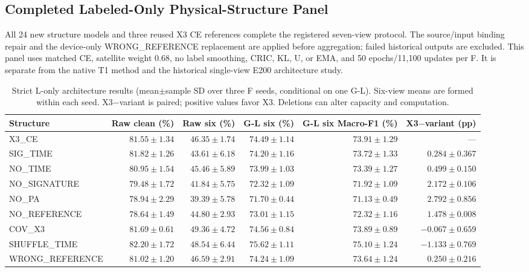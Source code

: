\subsection{Completed Labeled-Only Physical-Structure Panel}

All 24 new structure models and three reused X3 CE references complete the registered seven-view protocol. The source/input binding repair and the device-only WRONG\_REFERENCE replacement are applied before aggregation; failed historical outputs are excluded. This panel uses matched CE, satellite weight 0.68, no label smoothing, CRIC, KL, U, or EMA, and 50 epochs/11,100 updates per F. It is separate from the native T1 method and the historical single-view E200 architecture study.

\begin{table}[t]\centering\footnotesize\caption{Strict L-only architecture results (mean$\pm$sample SD over three F seeds, conditional on one G-L). Six-view means are formed within each seed. X3$-$variant is paired; positive values favor X3. Deletions can alter capacity and computation.}\label{tab:structure-complete}\begin{tabular}{lrrrrr}\toprule

Structure & Raw clean (\%) & Raw six (\%) & G-L six (\%) & G-L six Macro-F1 (\%) & X3$-$variant (pp)\\\midrule

X3\_CE & $81.55\pm1.34$ & $46.35\pm1.74$ & $74.49\pm1.14$ & $73.91\pm1.29$ & ---\\

SIG\_TIME & $81.82\pm1.26$ & $43.61\pm6.18$ & $74.20\pm1.16$ & $73.72\pm1.33$ & $0.284\pm0.367$\\

NO\_TIME & $80.95\pm1.54$ & $45.46\pm5.89$ & $73.99\pm1.03$ & $73.39\pm1.27$ & $0.499\pm0.150$\\

NO\_SIGNATURE & $79.48\pm1.72$ & $41.84\pm5.75$ & $72.32\pm1.09$ & $71.92\pm1.09$ & $2.172\pm0.106$\\

NO\_PA & $78.94\pm2.29$ & $39.39\pm5.78$ & $71.70\pm0.44$ & $71.13\pm0.49$ & $2.792\pm0.856$\\

NO\_REFERENCE & $78.64\pm1.49$ & $44.80\pm2.93$ & $73.01\pm1.15$ & $72.32\pm1.16$ & $1.478\pm0.008$\\

COV\_X3 & $81.69\pm0.61$ & $49.36\pm4.72$ & $74.56\pm0.84$ & $73.89\pm0.89$ & $-0.067\pm0.659$\\

SHUFFLE\_TIME & $82.20\pm1.72$ & $48.54\pm6.44$ & $75.62\pm1.11$ & $75.10\pm1.24$ & $-1.133\pm0.769$\\

WRONG\_REFERENCE & $81.02\pm1.20$ & $46.59\pm2.91$ & $74.24\pm1.09$ & $73.64\pm1.24$ & $0.250\pm0.216$\\

\bottomrule\end{tabular}\end{table}

